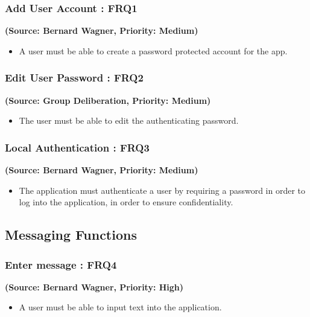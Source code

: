 \subsubsection{Add User Account : FRQ1}
\textbf{(Source: Bernard Wagner, Priority: Medium)}
\begin{itemize}
\item A user must be able to create a password protected account for the app.
\end{itemize}
\subsubsection{Edit User Password : FRQ2}
\textbf{(Source: Group Deliberation, Priority: Medium)}
\begin{itemize}
\item The user must be able to edit the authenticating password.
\end{itemize}
\subsubsection{Local Authentication : FRQ3}%
\textbf{(Source: Bernard Wagner, Priority: Medium)}
\begin{itemize}
\item The application must authenticate a user by requiring a password in order to log into the application, in order to ensure confidentiality.
\end{itemize}

\subsection{Messaging Functions}

\subsubsection{Enter message : FRQ4}%
\textbf{(Source: Bernard Wagner, Priority: High)}
\begin{itemize}
\item A user must be able to input text into the application.
\end{itemize}
